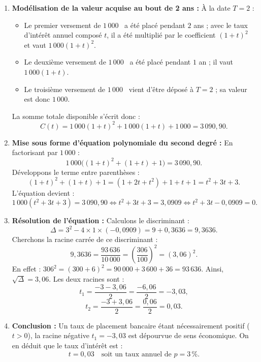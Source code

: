 \documentclass[11pt,a4paper]{article}
\providecommand{\euro}{\text{\officialeuro}}
\begin{document}
\begin{correctionbox}
\begin{enumerate}
    \item \textbf{Modélisation de la valeur acquise au bout de 2 ans :}
    À la date $T = 2$ :
    \begin{itemize}
        \item Le premier versement de $1\,000$~\euro{} a été placé pendant $2$ ans ; avec le taux d'intérêt annuel composé $t$, il a été multiplié par le coefficient $(1+t)^2$ et vaut $1\,000(1+t)^2$.
        \item Le deuxième versement de $1\,000$~\euro{} a été placé pendant $1$ an ; il vaut $1\,000(1+t)$.
        \item Le troisième versement de $1\,000$~\euro{} vient d'être déposé à $T = 2$ ; sa valeur est donc $1\,000$.
    \end{itemize}
    La somme totale disponible s'écrit donc :
    \[
    C(t) = 1\,000(1+t)^2 + 1\,000(1+t) + 1\,000 = 3\,090{,}90.
    \]

    \item \textbf{Mise sous forme d'équation polynomiale du second degré :}
    En factorisant par $1\,000$ :
    \[
    1\,000 \bigl( (1+t)^2 + (1+t) + 1 \bigr) = 3\,090{,}90.
    \]
    Développons le terme entre parenthèses :
    \[
    (1+t)^2 + (1+t) + 1 = (1 + 2t + t^2) + 1 + t + 1 = t^2 + 3t + 3.
    \]
    L'équation devient :
    \[
    1\,000(t^2 + 3t + 3) = 3\,090{,}90 \iff t^2 + 3t + 3 = 3{,}0909 \iff t^2 + 3t - 0{,}0909 = 0.
    \]

    \item \textbf{Résolution de l'équation :}
    Calculons le discriminant :
    \[
    \Delta = 3^2 - 4 \times 1 \times (-0{,}0909) = 9 + 0{,}3636 = 9{,}3636.
    \]
    Cherchons la racine carrée de ce discriminant :
    \[
    9{,}3636 = \frac{93\,636}{10\,000} = \left(\frac{306}{100}\right)^2 = (3{,}06)^2.
    \]
    En effet : $306^2 = (300 + 6)^2 = 90\,000 + 3\,600 + 36 = 93\,636$.
    Ainsi, $\sqrt{\Delta} = 3{,}06$. Les deux racines sont :
    \[
    t_1 = \frac{-3 - 3{,}06}{2} = \frac{-6{,}06}{2} = -3{,}03,
    \]
    \[
    t_2 = \frac{-3 + 3{,}06}{2} = \frac{0{,}06}{2} = 0{,}03.
    \]

    \item \textbf{Conclusion :}
    Un taux de placement bancaire étant nécessairement positif ($t > 0$), la racine négative $t_1 = -3{,}03$ est dépourvue de sens économique.
    On en déduit que le taux d'intérêt est :
    \[
    t = 0{,}03 \quad \text{soit un taux annuel de } p = 3\,\%.
    \]
\end{enumerate}
\end{correctionbox}
\end{document}
